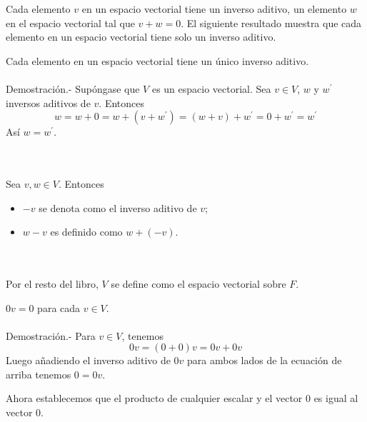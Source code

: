 Cada elemento $v$ en un espacio vectorial tiene un inverso aditivo, un elemento $w$ en el espacio vectorial tal que $v + w = 0$. El siguiente resultado muestra que cada elemento en un espacio vectorial tiene solo un inverso aditivo. \\

\begin{myteo}
    Cada elemento en un espacio vectorial tiene un único inverso aditivo.\\\\
	Demostración.-\; Supóngase que $V$ es un espacio vectorial. Sea $v\in V$,  $w$ y $w^{'}$ inversos aditivos de $v$. Entonces
	$$w=w+0=w+(v+w^{'}) = (w+v)+w^{'}=0+w^{'}=w^{'}$$
	Así $w=w^{'}$. 
\end{myteo}

\begin{mynot}[$\textbf{-v,w-v}$]\,\\\\
	Sea $v,w \in V$. Entonces
	\begin{itemize}
	    \item $-v$ se denota como el inverso aditivo de $v$;
	    \item $w-v$ es definido como $w+(-v)$.
	\end{itemize}
    \end{mynot}

    \begin{mynot}[$\textbf{V}$]\;\\\\
	Por el resto del libro, $V$ se define como el espacio vectorial sobre $F$.
    \end{mynot}

\begin{myteo}
    $0v=0$ para cada $v\in V$.\\\\
	Demostración.-\; Para $v\in V$, tenemos
	$$0v=(0+0)v=0v+0v$$
	Luego añadiendo el inverso aditivo de $0v$ para ambos lados de la ecuación de arriba tenemos $0=0v$. 
\end{myteo}
\vspace{0.3cm}

Ahora  establecemos que el producto de cualquier escalar y el vector $0$ es igual al vector $0$.\\

